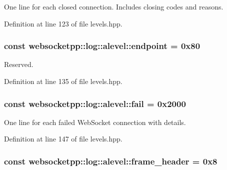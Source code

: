 One line for each closed connection. Includes closing codes and reasons. 



Definition at line 123 of file levels.\+hpp.

\hypertarget{structwebsocketpp_1_1log_1_1alevel_ad35433a6b8793f2bd1f5595386a09c73}{}
\subsubsection[{endpoint}]{ const websocketpp\+::log\+::alevel\+::endpoint = 0x80\hspace{0.3cm}{\ttfamily [static]}}\label{structwebsocketpp_1_1log_1_1alevel_ad35433a6b8793f2bd1f5595386a09c73}


Reserved. 



Definition at line 135 of file levels.\+hpp.

\hypertarget{structwebsocketpp_1_1log_1_1alevel_a2e485329910f92f8f6356cf27bafd4a2}{}
\subsubsection[{fail}]{ const websocketpp\+::log\+::alevel\+::fail = 0x2000\hspace{0.3cm}{\ttfamily [static]}}\label{structwebsocketpp_1_1log_1_1alevel_a2e485329910f92f8f6356cf27bafd4a2}


One line for each failed Web\+Socket connection with details. 



Definition at line 147 of file levels.\+hpp.

\hypertarget{structwebsocketpp_1_1log_1_1alevel_ac25fc7cb5fc229abb6fc893f16ffb678}{}
\subsubsection[{frame\+\_\+header}]{ const websocketpp\+::log\+::alevel\+::frame\+\_\+header = 0x8\hspace{0.3cm}{\ttfamily [static]}}\label{structwebsocketpp_1_1log_1_1alevel_ac25fc7cb5fc229abb6fc893f16ffb678}


